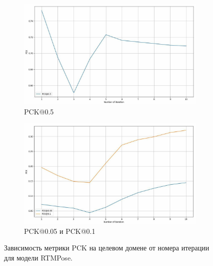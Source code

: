\begin{figure}[H]
\centering
\begin{subfigure}{.95\textwidth}
	\centering
	\includegraphics[width=\textwidth]{./images/results/rtmpose/rtmpose_pck}
	\caption{PCK@0.5}
	\label{fig:rtmpose_pck_05}
\end{subfigure}
\begin{subfigure}{.95\textwidth}
	\centering
	\includegraphics[width=\textwidth]{./images/results/rtmpose/rtmpose_pck_small}
	\caption{PCK@0.05 и PCK@0.1}
	\label{fig:rtmpose_pck_small}
\end{subfigure}
\caption{Зависимость метрики PCK на целевом домене от номера итерации для модели RTMPose.}
\label{fig:rtmpose_pck}
\end{figure}

